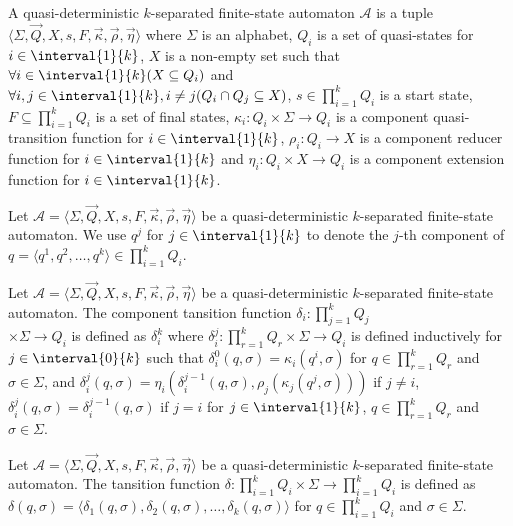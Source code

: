 \begin{definition}
	A quasi-deterministic $k$-separated finite-state automaton $\mathcal{A}$
	is a tuple $\langle \Sigma, \vec{Q}, X, s, F, \vec{\kappa},
	\vec{\rho}, \vec{\eta} \rangle$ where $\Sigma$ is an alphabet, $Q_i$ is
	a set of quasi-states for $i \in \interval{1}{k}$, $X$ is a non-empty set
	such that $\forall i \in \interval{1}{k} (X \subseteq Q_i)$ and $\forall i,
	j \in \interval{1}{k}, i \neq j (Q_i \cap Q_j \subseteq X)$, $s \in
	\prod_{i=1}^k{Q_i}$ is a start state, $F \subseteq \prod_{i=1}^k{Q_i}$
	is a set of final states, $\kappa_i : Q_i \times \Sigma \rightarrow Q_i$ is
	a component quasi-transition function for $i \in \interval{1}{k}$,
	$\rho_i : Q_i \rightarrow X$ is a component reducer function for $i \in
	\interval{1}{k}$ and $\eta_i : Q_i \times X \rightarrow Q_i$ is a component
	extension function for $i \in \interval{1}{k}$.
\end{definition}

\begin{remark}
	Let $\mathcal{A} = \langle \Sigma, \vec{Q}, X, s, F, \vec{\kappa},
	\vec{\rho}, \vec{\eta} \rangle$ be a quasi-deterministic $k$-separat\-ed
	finite-state automaton. We use $q^j$ for $j \in \interval{1}{k}$ to denote
	the $j$-th component of $q = \langle q^1, q^2, \ldots, q^k \rangle \in
	\prod_{i=1}^k{Q_i}$.
\end{remark}

\begin{definition}
	Let $\mathcal{A} = \langle \Sigma, \vec{Q}, X, s, F, \vec{\kappa},
	\vec{\rho}, \vec{\eta} \rangle$ be a quasi-deterministic $k$-separated
	finite-state automaton. The component tansition function $\delta_i :
	\prod_{j=1}^k{Q_j}$\\
	$\times \Sigma \rightarrow Q_i$ is defined as $\delta_i^k$ where
	$\delta_i^j : \prod_{r=1}^k{Q_r} \times \Sigma \rightarrow Q_i$ is defined
	inductively for $j \in \interval{0}{k}$ such that $\delta_i^0(q, \sigma) =
	\kappa_i(q^i, \sigma)$ for $q \in \prod_{r=1}^k{Q_r}$ and $\sigma \in
	\Sigma$, and $\delta_i^j(q, \sigma) = \eta_i(\delta_i^{j-1}(q, \sigma),
	\rho_j(\kappa_j(q^j, \sigma)))$ if $j \neq i$, $\delta_i^j(q, \sigma) =
	\delta_i^{j-1}(q, \sigma)$ if $j = i$ for $j \in \interval{1}{k}$, $q \in
	\prod_{r=1}^k{Q_r}$ and $\sigma \in \Sigma$.
\end{definition}

\begin{definition}
	Let $\mathcal{A} = \langle \Sigma, \vec{Q}, X, s, F, \vec{\kappa},
	\vec{\rho}, \vec{\eta} \rangle$
	be a quasi-deterministic $k$-separated finite-state automaton. The tansition
	function $\delta : \prod_{i=1}^k{Q_i} \times \Sigma \rightarrow
	\prod_{i=1}^k{Q_i}$ is defined as $\delta(q, \sigma) = \langle
	\delta_1(q, \sigma), \delta_2(q, \sigma), \ldots, \delta_k(q, \sigma)
	\rangle$ for $q \in \prod_{i=1}^k{Q_i}$ and $\sigma \in \Sigma$.
\end{definition}

